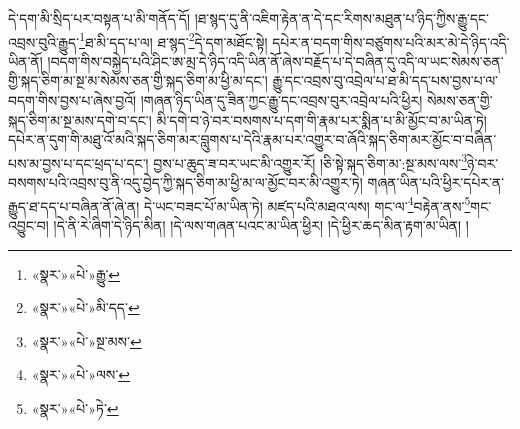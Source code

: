 དེ་དག་མི་སྲིད་པར་བསྟན་པ་མི་གནོད་དོ། །ཐ་སྙད་དུ་ནི་འཇིག་རྟེན་ན་དེ་དང་རིགས་མཐུན་པ་ཉིད་ཀྱིས་རྒྱུ་དང་འབྲས་བུའི་རྒྱུད་\footnote{«སྣར་»«པེ་»རྒྱུ་}ཐ་མི་དད་པ་ལ། ཐ་སྙད་\footnote{«སྣར་»«པེ་»མི་དད་}དེ་དག་མཐོང་སྟེ། དཔེར་ན་བདག་གིས་བཙུགས་པའི་མར་མེ་དེ་ཉིད་འདི་ཡིན་ནོ། །བདག་གིས་བསྐྱེད་པའི་ཤིང་ཨ་མྲ་དེ་ཉིད་འདི་ཡིན་ནོ་ཞེས་བརྗོད་པ་དེ་བཞིན་དུ་འདི་ལ་ཡང་སེམས་ཅན་གྱི་སྐད་ཅིག་མ་སྔ་མ་སེམས་ཅན་གྱི་སྐད་ཅིག་མ་ཕྱི་མ་དང་། རྒྱུ་དང་འབྲས་བུ་འབྲེལ་པ་ཐ་མི་དད་པས་བྱས་པ་ལ་བདག་གིས་བྱས་པ་ཞེས་བྱའོ། །གཞན་ཉིད་ཡིན་དུ་ཟིན་ཀྱང་རྒྱུ་དང་འབྲས་བུར་འབྲེལ་པའི་ཕྱིར། སེམས་ཅན་གྱི་སྐད་ཅིག་མ་སྔ་མས་དགེ་བ་དང་། མི་དགེ་བ་ཉེ་བར་བསགས་པ་དག་གི་རྣམ་པར་སྨིན་པ་མི་མྱོང་བ་མ་ཡིན་ཏེ། དཔེར་ན་དུག་གི་མཐུ་འོ་མའི་སྐད་ཅིག་མར་བླུགས་པ་དེའི་རྣམ་པར་འགྱུར་བ་ཞོའི་སྐད་ཅིག་མར་མྱོང་བ་བཞིན་པས་མ་བྱས་པ་དང་ཕྲད་པ་དང་། བྱས་པ་ཆུད་ཟ་བར་ཡང་མི་འགྱུར་རོ། །ཅི་སྟེ་སྐད་ཅིག་མ་:སྔ་མས་ལས་\footnote{«སྣར་»«པེ་»སྔ་མས་}ཉེ་བར་བསགས་པའི་འབྲས་བུ་ནི་འདུ་བྱེད་ཀྱི་སྐད་ཅིག་མ་ཕྱི་མ་ལ་མྱོང་བར་མི་འགྱུར་ཏེ། གཞན་ཡིན་པའི་ཕྱིར་དཔེར་ན་རྒྱུད་ཐ་དད་པ་བཞིན་ནོ་ཞེ་ན། དེ་ཡང་བཟང་པོ་མ་ཡིན་ཏེ། མཛད་པའི་མཐའ་ལས། གང་ལ་\footnote{«སྣར་»«པེ་»ལས་}བརྟེན་ནས་\footnote{«སྣར་»«པེ་»ཏེ་}གང་འབྱུང་བ། །དེ་ནི་རེ་ཞིག་དེ་ཉིད་མིན། །དེ་ལས་གཞན་པའང་མ་ཡིན་ཕྱིར། །དེ་ཕྱིར་ཆད་མིན་རྟག་མ་ཡིན། །
